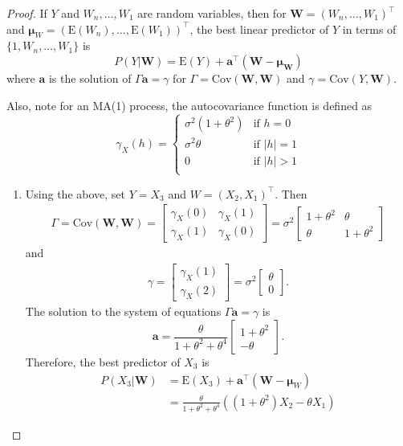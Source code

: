 \documentclass[12pt]{article}
\theoremstyle{definition}
\newcommand{\E}{\text{E}}
\newcommand{\Co}[2]{\text{Cov}\left({#1}, {#2}\right)}
\newcommand{\vect}[1]{\boldsymbol{#1}}
\begin{document}
\begin{proof}
  If $Y$ and $W_n, \dots, W_1$ are random variables, then for $\vect{W} = (W_n, \dots, W_1)^\intercal$
  and $\vect{\mu}_W= \left(\E(W_n), \dots, \E(W_1)\right)^\intercal$, the best linear
  predictor of $Y$ in terms of $\{1, W_n, \dots, W_1\}$ is
  \[
    P(Y|\vect{W}) = \E(Y) + \vect{a}^\intercal (\vect{W} - \vect{\mu_W})
  \]
  where $\vect{a}$ is the solution of $\Gamma \vect{a} = \gamma$ for
  $\Gamma = \Co{\vect{W}}{\vect{W}}$ and $\gamma = \Co{Y}{\vect{W}}$.

  Also, note for an MA(1) process, the autocovariance function is defined as
  \[
    \gamma_X(h) =
    \begin{cases}
      \sigma^2 (1 + \theta^2) & \text{if $h = 0$}\\
      \sigma^2 \theta & \text{if $|h| = 1$}\\
      0 & \text{if $|h| > 1$}\\
    \end{cases}
  \]
  \begin{enumerate}
    \item Using the above, set $Y = X_3$ and $W = (X_2, X_1)^\intercal$. Then
      \begin{align*}
        \Gamma = \Co{\vect{W}}{\vect{W}} =
        \begin{bmatrix} \gamma_X(0) & \gamma_X(1) \\ \gamma_X(1) & \gamma_X(0) \end{bmatrix} =
        \sigma^2 \begin{bmatrix} 1 + \theta^2 & \theta \\ \theta & 1 + \theta^2 \end{bmatrix}
      \end{align*}
      and
      \begin{align*}
        \gamma = \begin{bmatrix} \gamma_X(1) \\ \gamma_X(2) \end{bmatrix}
        = \sigma^2 \begin{bmatrix} \theta \\ 0 \end{bmatrix}.
      \end{align*}
      The solution to the system of equations $\Gamma \vect{a} = \gamma$ is
      $$\vect{a} = \frac{\theta}{1 + \theta^2 + \theta^4} \begin{bmatrix}1 + \theta^2 \\ -\theta\end{bmatrix}.$$
      Therefore, the best predictor of $X_3$ is
      \begin{align*}
        P(X_3|\vect{W}) &= \E(X_3) + \vect{a}^\intercal (\vect{W} - \vect{\mu}_W) \\
        &= \frac{\theta}{1 + \theta^2 + \theta^4} ((1 + \theta^2) X_2 - \theta X_1)
      \end{align*}


\end{enumerate}
\end{proof}
\end{document}
